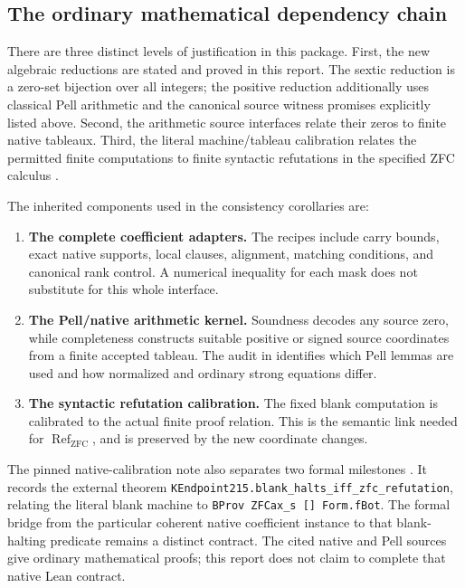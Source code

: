\documentclass[11pt,a4paper]{article}
\theoremstyle{definition}
\newcommand{\ZFC}{\mathrm{ZFC}}
\newcommand{\ZFCRef}{\operatorname{Ref}}
\begin{document}
\subsection{The ordinary mathematical dependency chain}

There are three distinct levels of justification in this package.
First, the new algebraic reductions are stated and proved in this
report.  The sextic reduction is a zero-set bijection over all integers;
the positive reduction additionally uses classical Pell arithmetic and
the canonical source witness promises explicitly listed above.
Second, the arithmetic source interfaces relate their zeros to finite
native tableaux.  Third, the literal machine/tableau calibration relates
the permitted finite computations to finite syntactic refutations in
the specified ZFC calculus
\cite{source34,source44,source64,fixed-source}.

The inherited components used in the consistency corollaries are:
\begin{enumerate}
 \item \textbf{The complete coefficient adapters.}
 The recipes include carry bounds, exact native supports, local clauses,
 alignment, matching conditions, and canonical rank control.  A numerical
 inequality for each mask does not substitute for this whole interface.
 \item \textbf{The Pell/native arithmetic kernel.}
 Soundness decodes any source zero, while completeness constructs
 suitable positive or signed source coordinates from a finite accepted
 tableau.  The audit in \cite{pell-audit} identifies which Pell lemmas
 are used and how normalized and ordinary strong equations differ.
 \item \textbf{The syntactic refutation calibration.}
 The fixed blank computation is calibrated to the actual finite
 proof relation.  This is the semantic link needed for
 \(\ZFCRef_{\ZFC}\), and is preserved by the new coordinate changes.
\end{enumerate}

The pinned native-calibration note also separates two formal milestones
\cite{native-calibration}.  It records the external theorem
\texttt{KEndpoint215.blank\_halts\_iff\_zfc\_refutation}, relating the
literal blank machine to \texttt{BProv ZFCax\_s [] Form.fBot}.
The formal bridge from the particular coherent native coefficient
instance to that blank-halting predicate remains a distinct contract.
The cited native and Pell sources give ordinary mathematical proofs;
this report does not claim to complete that native Lean contract.
\end{document}
